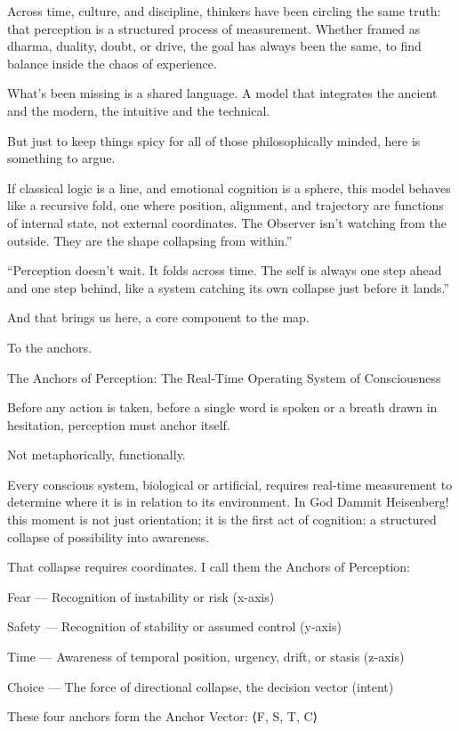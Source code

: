 \documentclass[11pt]{article}
\begin{document}
Across time, culture, and discipline, thinkers have been circling the same truth: that perception is a structured process of measurement. Whether framed as dharma, duality, doubt, or drive, the goal has always been the same, to find balance inside the chaos of experience.

What’s been missing is a shared language. A model that integrates the ancient and the modern, the intuitive and the technical. 

But just to keep things spicy for all of those philosophically minded, here is something to argue.

If classical logic is a line, and emotional cognition is a sphere, this model behaves like a recursive fold, one where position, alignment, and trajectory are functions of internal state, not external coordinates. The Observer isn’t watching from the outside. They are the shape collapsing from within.”

“Perception doesn’t wait. It folds across time. The self is always one step ahead and one step behind, like a system catching its own collapse just before it lands.”

And that brings us here, a core component to the map. 

To the anchors. 

The Anchors of Perception: The Real-Time Operating System of Consciousness

Before any action is taken, before a single word is spoken or a breath drawn in hesitation, perception must anchor itself.

Not metaphorically, functionally.

Every conscious system, biological or artificial, requires real-time measurement to determine where it is in relation to its environment. In God Dammit Heisenberg! this moment is not just orientation; it is the first act of cognition: a structured collapse of possibility into awareness.

That collapse requires coordinates.
I call them the Anchors of Perception:

Fear — Recognition of instability or risk (x-axis)

Safety — Recognition of stability or assumed control (y-axis)

Time — Awareness of temporal position, urgency, drift, or stasis (z-axis)

Choice — The force of directional collapse, the decision vector (intent)

These four anchors form the Anchor Vector:
⟨F, S, T, C⟩
\end{document}
